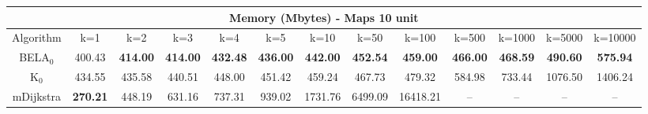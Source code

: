 \begin{tabular}{c|cccccccccccc}\toprule
\multicolumn{13}{c}{Memory (Mbytes) - Maps 10 unit}\\ \midrule
Algorithm & k=1 & k=2 & k=3 & k=4 & k=5 & k=10 & k=50 & k=100 & k=500 & k=1000 & k=5000 & k=10000 \\ \midrule
BELA$_0$ & 400.43 & \textbf{414.00} & \textbf{414.00} & \textbf{432.48} & \textbf{436.00} & \textbf{442.00} & \textbf{452.54} & \textbf{459.00} & \textbf{466.00} & \textbf{468.59} & \textbf{490.60} & \textbf{575.94} \\
K$_0$ & 434.55 & 435.58 & 440.51 & 448.00 & 451.42 & 459.24 & 467.73 & 479.32 & 584.98 & 733.44 & 1076.50 & 1406.24 \\
mDijkstra & \textbf{270.21} & 448.19 & 631.16 & 737.31 & 939.02 & 1731.76 & 6499.09 & 16418.21 & -- & -- & -- & -- \\ \bottomrule 
\end{tabular}
